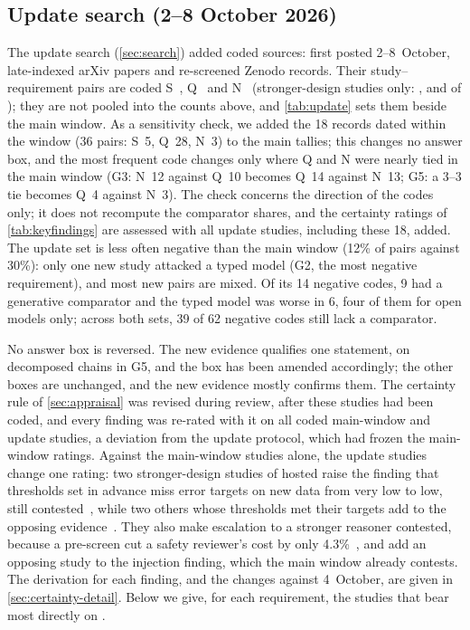 \FloatBarrier

\subsection{Update search (2--8 October 2026)}
\label{sec:update}

The update search (\cref{sec:search}) added \nUCoded{} coded sources: \nUSetPostWindow{} first posted 2--8~October, \nUSetLateIndexed{} late-indexed arXiv papers and \nUSetReScreened{} re-screened Zenodo records.
Their \nURows{} study--requirement pairs are coded S~\nUS{}, Q~\nUQ{} and N~\nUN{} (stronger-design studies only: \nUStrongS{}, \nUStrongQ{} and \nUStrongN{} of \nUStrongRows{}); they are not pooled into the counts above, and \cref{tab:update} sets them beside the main window.
As a sensitivity check, we added the 18 records dated within the window (36 pairs: S~5, Q~28, N~3) to the main tallies; this changes no answer box, and the most frequent code changes only where Q and N were nearly tied in the main window (G3: N~12 against Q~10 becomes Q~14 against N~13; G5: a 3--3 tie becomes Q~4 against N~3).
The check concerns the direction of the codes only; it does not recompute the comparator shares, and the certainty ratings of \cref{tab:keyfindings} are assessed with all update studies, including these 18, added.
The update set is less often negative than the main window (12\% of pairs against 30\%): only one new study attacked a typed model (G2, the most negative requirement), and most new pairs are mixed.
Of its 14 negative codes, 9 had a generative comparator and the typed model was worse in 6, four of them for open models only; across both sets, 39 of 62 negative codes still lack a comparator.

No answer box is reversed.
The new evidence qualifies one statement, on decomposed chains in G5, and the box has been amended accordingly; the other boxes are unchanged, and the new evidence mostly confirms them.
The certainty rule of \cref{sec:appraisal} was revised during review, after these studies had been coded, and every finding was re-rated with it on all coded main-window and update studies, a deviation from the update protocol, which had frozen the main-window ratings.
Against the main-window studies alone, the update studies change one rating: two stronger-design studies of hosted \jev{} raise the finding that thresholds set in advance miss error targets on new data from very low to low, still contested~\cite{arx03387,arx02267}, while two others whose thresholds met their targets add to the opposing evidence~\cite{zen22935043,zen23075657}\zmark{}. They also make escalation to a stronger reasoner contested, because a \jev{} pre-screen cut a safety reviewer's cost by only 4.3\%~\cite{arx02267}, and add an opposing study to the injection finding, which the main window already contests.
The derivation for each finding, and the changes against 4~October, are given in \cref{sec:certainty-detail}.
Below we give, for each requirement, the studies that bear most directly on \pol{}.

